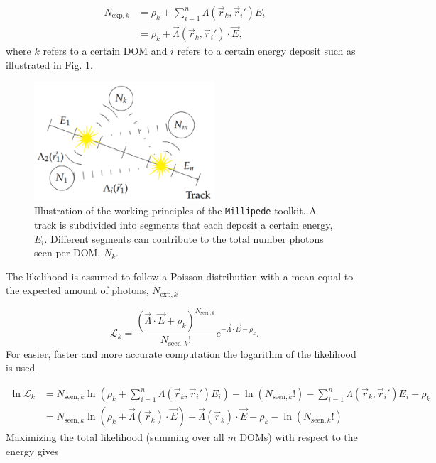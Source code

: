 \begin{equation}
\label{eq:n_exp}
\begin{split}
N_{\textrm{exp},k} &= \rho_k + \sum^n_{i=1} \Lambda(\vec{r}_k,\vec{r}_i') E_i\\
&= \rho_k + \vec{\Lambda}(\vec{r}_k,\vec{r}_i') \cdot \vec{E},
\end{split}
\end{equation}
where $k$ refers to a certain DOM and $i$ refers to a certain energy deposit such as illustrated in Fig. \ref{fig:millipede}.

\begin{figure}
\centering
\includegraphics[width=0.6\textwidth]{chapter7/img/millipede.png}
\caption{Illustration of the working principles of the \texttt{Millipede} toolkit. A track is subdivided into segments that each deposit a certain energy, $E_i$. Different segments can contribute to the total number photons seen per DOM, $N_k$.}
\label{fig:millipede}
\end{figure}

The likelihood is assumed to follow a Poisson distribution with a mean equal to the expected amount of photons, $N_{\textrm{exp},k}$

\begin{equation}
\mathcal{L}_k = \frac{\left(\vec{\Lambda} \cdot \vec{E} + \rho_k \right)^{N_{\textrm{seen},k}}}{N_{\textrm{seen},k}!} e^{-\vec{\Lambda} \cdot \vec{E} - \rho_k}.
\end{equation}
\noindent For easier, faster and more accurate computation the logarithm of the likelihood is used

\begin{equation}
\begin{split}
\ln \mathcal{L}_k &= N_{\textrm{seen},k} \ln \left(\rho_k + \sum^n_{i=1} \Lambda(\vec{r}_k,\vec{r}_i') E_i \right) - \ln \left(N_{\textrm{seen},k}!\right) - \sum^n_{i=1} \Lambda(\vec{r}_k,\vec{r}_i') E_i - \rho_k\\
&= N_{\textrm{seen},k} \ln \left(\rho_k + \vec{\Lambda}(\vec{r}_k) \cdot \vec{E} \right) - \vec{\Lambda}(\vec{r}_k) \cdot \vec{E} - \rho_k - \ln\left(N_{\textrm{seen},k}!\right)
\end{split}
\end{equation}
\noindent Maximizing the total likelihood (summing over all $m$ DOMs) with respect to the energy gives 

